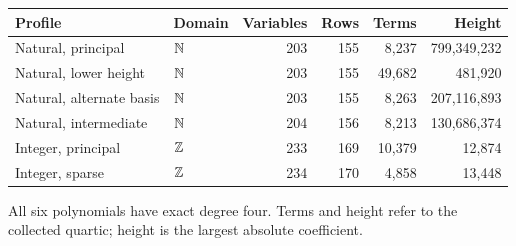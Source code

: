\begin{center}
\small
\begin{tabular}{llrrrr}
\toprule
Profile & Domain & Variables & Rows & Terms & Height\\
\midrule
Natural, principal & $\mathbb N$ & 203 & 155 & 8,237 & 799,349,232\\
Natural, lower height & $\mathbb N$ & 203 & 155 & 49,682 & 481,920\\
Natural, alternate basis & $\mathbb N$ & 203 & 155 & 8,263 & 207,116,893\\
Natural, intermediate & $\mathbb N$ & 204 & 156 & 8,213 & 130,686,374\\
Integer, principal & $\mathbb Z$ & 233 & 169 & 10,379 & 12,874\\
Integer, sparse & $\mathbb Z$ & 234 & 170 & 4,858 & 13,448\\
\bottomrule
\end{tabular}
\end{center}
All six polynomials have exact degree four. Terms and height refer
to the collected quartic; height is the largest absolute coefficient.
